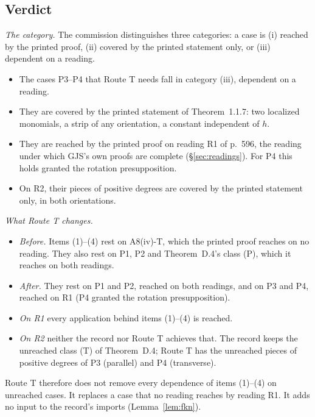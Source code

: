 \documentclass[11pt,a4paper]{article}
\theoremstyle{plain}
\theoremstyle{definition}
\begin{document}
\subsection{Verdict}

\emph{The category.}  The commission distinguishes three categories: a case is (i) reached by the
printed proof, (ii) covered by the printed statement only, or (iii) dependent on a reading.
\begin{itemize}
\item The cases P3--P4 that Route T needs fall in category (iii), dependent on a reading.
\item They are covered by the printed statement of Theorem~1.1.7: two localized monomials, a
strip of any orientation, a constant independent of $h$.
\item They are reached by the printed proof on reading R1 of p.~596, the reading under which
GJS's own proofs are complete (\S\ref{sec:readings}).  For P4 this holds granted the rotation
presupposition.
\item On R2, their pieces of positive degrees are covered by the printed statement only, in both
orientations.
\end{itemize}

\emph{What Route T changes.}
\begin{itemize}
\item \emph{Before.}  Items (1)--(4) rest on A8(iv)-T, which the printed proof reaches on no
reading.  They also rest on P1, P2 and Theorem~D.4's class (P), which it reaches on both
readings.
\item \emph{After.}  They rest on P1 and P2, reached on both readings, and on P3 and P4, reached
on R1 (P4 granted the rotation presupposition).
\item \emph{On R1} every application behind items (1)--(4) is reached.
\item \emph{On R2} neither the record nor Route T achieves that.  The record keeps the unreached
class (T) of Theorem~D.4; Route T has the unreached pieces of positive degrees of P3 (parallel)
and P4 (transverse).
\end{itemize}
Route T therefore does not remove every dependence of items (1)--(4) on unreached cases.  It
replaces a case that no reading reaches by reading R1.  It adds no input to the record's imports
(Lemma~\ref{lem:fkn}).
\end{document}
